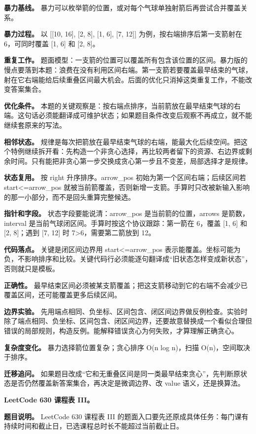 \textbf{暴力基线。} 暴力可以枚举箭的位置，或对每个气球单独射箭后再尝试合并覆盖关系。

\textbf{暴力过程。} 以 [[10, 16], [2, 8], [1, 6], [7, 12]] 为例，按右端排序后第一支箭射在 6，可同时覆盖 [1, 6] 和 [2, 8]。

\textbf{重复工作。} 题面模型：一支箭的位置可以覆盖所有包含该位置的区间。暴力版的慢点要落到本题：浪费在没有利用区间右端。第一支箭若要覆盖最早结束的气球，射在它右端能给后续重叠区间最大机会。后面的优化只消掉这类重复工作，不能改变答案集合。

\textbf{优化条件。} 本题的关键观察是：按右端点排序，当前箭放在最早结束气球的右端。这句话必须能翻译成可维护状态；如果题目条件改变后观察不再成立，就不能继续套原来的写法。

\textbf{相邻状态。} 规律是每次把箭放在最早结束气球的右端，能最大化后续空间。把这个特例继续拆开看：先构造一个非贪心选择，再比较两者留下的资源、右边界或剩余时间。只有能把非贪心第一步交换成贪心第一步且不变差，局部选择才是规律。

\textbf{状态复用。} 按 right 升序排序。arrow\_pos 初始为第一个区间右端；后续区间若 start<=arrow\_pos 就被当前箭覆盖，否则新增一支箭。手算时只改被新输入影响的那一小部分，而不是回头重算完整候选。

\textbf{指针和字段。} 状态字段要能说清：arrow\_pos 是当前箭的位置，arrows 是箭数，interval 是当前气球闭区间。手算时按这个协议跟踪：第一箭在 6，覆盖 [1, 6] 和 [2, 8]；遇到 [7, 12] 时 7>6，需要第二箭放到 12。

\textbf{代码落点。} 关键是闭区间边界用 start<=arrow\_pos 表示能覆盖。坐标可能为负，不影响排序和比较。关键代码行必须能逐句翻译成“旧状态怎样变成新状态”，否则就只是模板。

\textbf{正确性。} 最早结束区间必须被某支箭覆盖；把这支箭移动到它的右端不会减少已覆盖区间，还可能覆盖更多后续区间。

\textbf{边界实验。} 先用端点相同、负坐标、区间包含、闭区间边界做反例检查。实验时除了端点相同、负坐标、区间包含、闭区间边界，还要故意替换成一个看似合理但错误的局部规则，构造反例。能解释错误贪心为何失败，才算理解正确贪心。

\textbf{复杂度变化。} 暴力选择箭位置复杂；贪心排序 O(n log n)，扫描 O(n)，空间取决于排序。

\textbf{迁移追问。} 如果题目改成“它和无重叠区间是同一类最早结束贪心”，先判断原状态是否仍然覆盖新答案集合，再决定是微调边界、改 value 语义，还是换算法。

\noindent\textbf{LeetCode 630 课程表 III。}

\textbf{题目说明。} LeetCode 630 课程表 III 的题面入口要先还原成具体任务：每门课有持续时间和截止日，已选课程总时长不能超过当前截止日。

